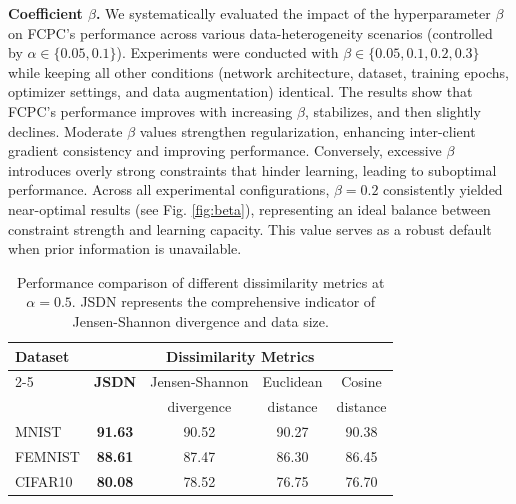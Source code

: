 \documentclass[journal,twoside,web]{ieeecolor}
\begin{document}
\textbf{Coefficient $\beta$. }We systematically evaluated the impact of the hyperparameter $\beta$ on FCPC's performance across various data-heterogeneity scenarios (controlled by $\alpha \in \{0.05, 0.1\}$). Experiments were conducted with $\beta \in \{0.05, 0.1, 0.2, 0.3\}$ while keeping all other conditions (network architecture, dataset, training epochs, optimizer settings, and data augmentation) identical.
The results show that FCPC's performance improves with increasing $\beta$, stabilizes, and then slightly declines. Moderate $\beta$ values strengthen regularization, enhancing inter-client gradient consistency and improving performance. Conversely, excessive $\beta$ introduces overly strong constraints that hinder learning, leading to suboptimal performance.
Across all experimental configurations, $\beta = 0.2$ consistently yielded near-optimal results (see Fig. \ref{fig:beta}), representing an ideal balance between constraint strength and learning capacity. This value serves as a robust default when prior information is unavailable.


\begin{table}[htbp]
\caption{Performance comparison of different dissimilarity metrics at $\alpha = 0.5$. JSDN represents the comprehensive indicator of Jensen-Shannon divergence and data size.}
\label{tab:dissimilarity}
\centering
\footnotesize  %
\begin{tabular}{lcccc}
\toprule
\multirow{2}{*}{Dataset} & \multicolumn{4}{c}{Dissimilarity Metrics} \\
\cmidrule(lr){2-5}
& \textbf{JSDN} & \multicolumn{1}{c}{Jensen-Shannon} & \multicolumn{1}{c}{Euclidean} & \multicolumn{1}{c}{Cosine} \\
& & \multicolumn{1}{c}{divergence} & \multicolumn{1}{c}{distance} & \multicolumn{1}{c}{distance} \\
\midrule
MNIST    & \textbf{91.63} & 90.52 & 90.27 & 90.38 \\
FEMNIST  & \textbf{88.61} & 87.47 & 86.30 & 86.45 \\
CIFAR10  & \textbf{80.08} & 78.52 & 76.75 & 76.70 \\
\bottomrule
\end{tabular}
\label{tab:comparsion of metrics}
\end{table}
\end{document}
